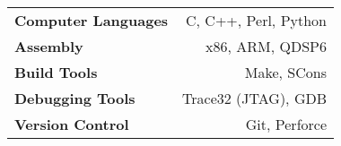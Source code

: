 \begin{tabular}{ l r }
\textbf{Computer Languages} & C, C++, Perl, Python \\
\textbf{Assembly} & x86, ARM, QDSP6 \\
\textbf{Build Tools} & Make, SCons \\
\textbf{Debugging Tools} & Trace32 (JTAG), GDB \\
\textbf{Version Control} & Git, Perforce \\
\end{tabular}

